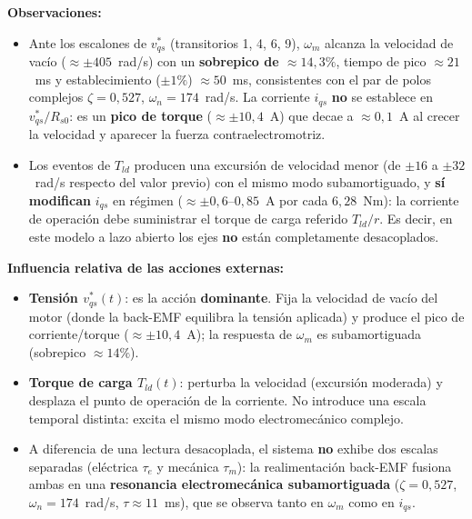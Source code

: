\documentclass[12pt, a4paper,journal, onecolumn, compsoc]{IEEEtran}
\begin{document}
\textbf{Observaciones:}
\begin{itemize}
    \item Ante los escalones de $v_{qs}^*$ (transitorios 1, 4, 6, 9), $\omega_m$ alcanza la velocidad de vacío ($\approx \pm 405$~rad/s) con un \textbf{sobrepico de $\approx 14{,}3\%$}, tiempo de pico $\approx 21$~ms y establecimiento ($\pm 1\%$) $\approx 50$~ms, consistentes con el par de polos complejos $\zeta = 0{,}527$, $\omega_n = 174$~rad/s. La corriente $i_{qs}$ \textbf{no} se establece en $v_{qs}^*/R_{s0}$: es un \textbf{pico de torque} ($\approx \pm 10{,}4$~A) que decae a $\approx 0{,}1$~A al crecer la velocidad y aparecer la fuerza contraelectromotriz.

    \item Los eventos de $T_{ld}$ producen una excursión de velocidad menor (de $\pm 16$ a $\pm 32$~rad/s respecto del valor previo) con el mismo modo subamortiguado, y \textbf{sí modifican} $i_{qs}$ en régimen ($\approx \pm 0{,}6$--$0{,}85$~A por cada $6{,}28$~Nm): la corriente de operación debe suministrar el torque de carga referido $T_{ld}/r$. Es decir, en este modelo a lazo abierto los ejes \textbf{no} están completamente desacoplados.
\end{itemize}

\textbf{Influencia relativa de las acciones externas:}

\begin{itemize}
    \item \textbf{Tensión $v_{qs}^*(t)$}: es la acción \textbf{dominante}. Fija la velocidad de vacío del motor (donde la back-EMF equilibra la tensión aplicada) y produce el pico de corriente/torque ($\approx \pm 10{,}4$~A); la respuesta de $\omega_m$ es subamortiguada (sobrepico $\approx 14\%$).

    \item \textbf{Torque de carga $T_{ld}(t)$}: perturba la velocidad (excursión moderada) y desplaza el punto de operación de la corriente. No introduce una escala temporal distinta: excita el mismo modo electromecánico complejo.

    \item A diferencia de una lectura desacoplada, el sistema \textbf{no} exhibe dos escalas separadas (eléctrica $\tau_e$ y mecánica $\tau_m$): la realimentación back-EMF fusiona ambas en una \textbf{resonancia electromecánica subamortiguada} ($\zeta = 0{,}527$, $\omega_n = 174$~rad/s, $\tau \approx 11$~ms), que se observa tanto en $\omega_m$ como en $i_{qs}$.
\end{itemize}
\end{document}
